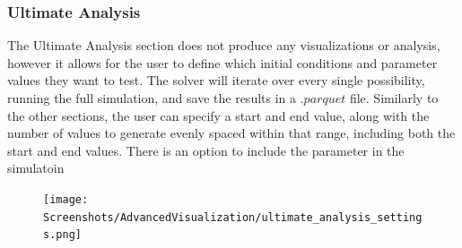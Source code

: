 \subsubsection{Ultimate Analysis}
The Ultimate Analysis section does not produce any visualizations or analysis, however it allows for the user to define which initial conditions and parameter values they want to test. 
The solver will iterate over every single possibility, running the full simulation, and save the results in a $.parquet$ file. 
Similarly to the other sections, the user can specify a start and end value, along with the number of values to generate evenly spaced within that range, including both the start and end values. 
There is an option to include the parameter in the simulatoin
\begin{figure}
    \centering
    \texttt{[image: Screenshots/AdvancedVisualization/ultimate\_analysis\_settings.png]}
    \caption{
    }
    \label{fig:ss:av:ultimate_analysis_settings}
\end{figure}
